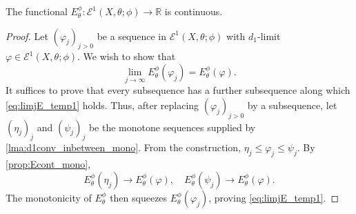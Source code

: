 \begin{theorem}\label{thm:Efuncont}
    The functional $E_{\theta}^{\phi}\colon \mathcal{E}^1(X,\theta;\phi) \rightarrow \mathbb{R}$ is continuous.
\end{theorem}
\begin{proof}
    Let $(\varphi_j)_{j>0}$ be a sequence in $\mathcal{E}^1(X,\theta;\phi)$ with $d_1$-limit $\varphi\in \mathcal{E}^1(X,\theta;\phi)$. We wish to show that
    \begin{equation}\label{eq:limjE_temp1}
        \lim_{j\to\infty} E_{\theta}^{\phi}(\varphi_j)=E_{\theta}^{\phi}(\varphi).
    \end{equation}
    It suffices to prove that every subsequence has a further subsequence along which \eqref{eq:limjE_temp1} holds. Thus, after replacing $(\varphi_j)_{j>0}$ by a subsequence, let $(\eta_j)_j$ and $(\psi_j)_j$ be the monotone sequences supplied by \cref{lma:d1conv_inbetween_mono}. From the construction, $\eta_j\leq \varphi_j\leq \psi_j$. By \cref{prop:Econt_mono},
    \[
        E_{\theta}^{\phi}(\eta_j)\to E_{\theta}^{\phi}(\varphi),\quad E_{\theta}^{\phi}(\psi_j)\to E_{\theta}^{\phi}(\varphi).
    \]
    The monotonicity of $E_{\theta}^{\phi}$ then squeezes $E_{\theta}^{\phi}(\varphi_j)$, proving \eqref{eq:limjE_temp1}.
\end{proof}


